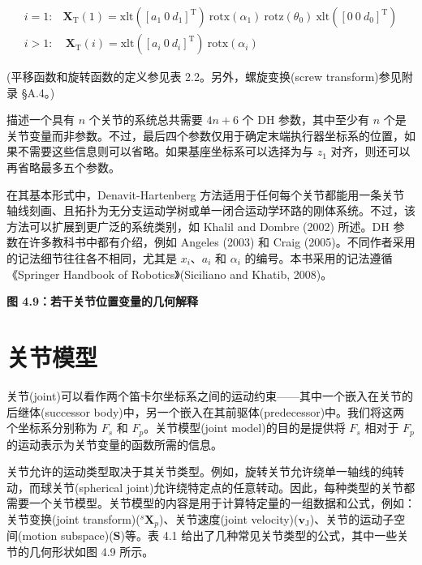 \documentclass[10pt,a4paper]{book}
\theoremstyle{thmstyle} %
\theoremstyle{defstyle} %
\theoremstyle{prostyle} %
\begin{document}
$$
\begin{array}{rl} { i = 1 : } & { } \mathbf{X}_{\mathrm{T}}(1) = \mathrm{xlt}([a_1 \ 0 \ d_1]^{\mathrm{T}}) \ \mathrm{rotx}(\alpha_1) \ \mathrm{rotz}(\theta_0) \ \mathrm{xlt}([0 \ 0 \ d_0]^{\mathrm{T}}) \\{ i > 1 : } & { } \ \mathbf{X}_{\mathrm{T}}(i) = \mathrm{xlt}([a_i \ 0 \ d_i]^{\mathrm{T}}) \ \mathrm{rotx}(\alpha_i) \end{array}
$$



(平移函数和旋转函数的定义参见表 2.2。另外，螺旋变换(screw transform)参见附录 §A.4。)



描述一个具有 $n$ 个关节的系统总共需要 $4n+6$ 个 DH 参数，其中至少有 $n$ 个是关节变量而非参数。不过，最后四个参数仅用于确定末端执行器坐标系的位置，如果不需要这些信息则可以省略。如果基座坐标系可以选择为与 $z_1$ 对齐，则还可以再省略最多五个参数。



在其基本形式中，Denavit-Hartenberg 方法适用于任何每个关节都能用一条关节轴线刻画、且拓扑为无分支运动学树或单一闭合运动学环路的刚体系统。不过，该方法可以扩展到更广泛的系统类别，如 Khalil and Dombre (2002) 所述。DH 参数在许多教科书中都有介绍，例如 Angeles (2003) 和 Craig (2005)。不同作者采用的记法细节往往各不相同，尤其是 $x_i$、$a_i$ 和 $\alpha_i$ 的编号。本书采用的记法遵循《Springer Handbook of Robotics》(Siciliano and Khatib, 2008)。



\noindent\textbf{图 4.9：若干关节位置变量的几何解释}





\section{关节模型}





关节(joint)可以看作两个笛卡尔坐标系之间的运动约束——其中一个嵌入在关节的后继体(successor body)中，另一个嵌入在其前驱体(predecessor)中。我们将这两个坐标系分别称为 $F_s$ 和 $F_p$。关节模型(joint model)的目的是提供将 $F_s$ 相对于 $F_p$ 的运动表示为关节变量的函数所需的信息。



关节允许的运动类型取决于其关节类型。例如，旋转关节允许绕单一轴线的纯转动，而球关节(spherical joint)允许绕特定点的任意转动。因此，每种类型的关节都需要一个关节模型。关节模型的内容是用于计算特定量的一组数据和公式，例如：关节变换(joint transform)($^{s}\mathbf{X}_{p}$)、关节速度(joint velocity)($\mathbf{v}_{\mathrm{J}}$)、关节的运动子空间(motion subspace)($\mathbf{S}$)等。表 4.1 给出了几种常见关节类型的公式，其中一些关节的几何形状如图 4.9 所示。
\end{document}
